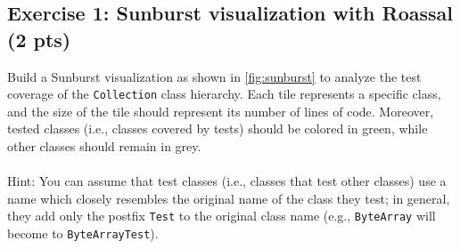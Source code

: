 \documentclass [11pt, a4wide, twoside]{article}
\begin{document}

\newpage

\subsection*{Exercise 1: Sunburst visualization with Roassal (2 pts)}
Build a Sunburst visualization as shown in \autoref{fig:sunburst} to analyze the test coverage of the \texttt{Collection} class hierarchy. Each tile represents a specific class, and the size of the tile should represent its number of lines of code. Moreover, tested classes (i.e., classes covered by tests) should be colored in green, while other classes should remain in grey.\\\\
Hint: You can assume that test classes (i.e., classes that test other classes) use a name which closely resembles the original name of the class they test; in general, they add only the postfix \texttt{Test} to the original class name (e.g., \texttt{ByteArray} will become to \texttt{ByteArrayTest}).\\
\end{document}
